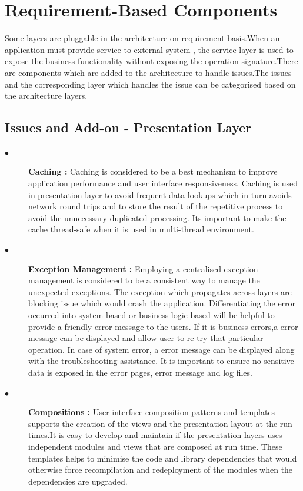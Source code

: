 \section{ Requirement-Based Components  }

			Some layers are pluggable in the architecture on requirement basis.When an application must provide service to external system , the service layer is used to expose the business functionality without exposing the operation signature.There are components which are added to the architecture to handle issues.The issues and the corresponding layer which handles the issue can be categorised based on the architecture layers.
			
\subsection{Issues and Add-on - Presentation Layer}	

\begin{description}
  \item[$\bullet$]{\bfseries Caching :} Caching is considered to be a best mechanism to improve application performance and user interface responsiveness. Caching is used in presentation layer to avoid frequent data lookups which in turn avoids network round trips and to store the result of the repetitive process to avoid the unnecessary duplicated processing. Its important to make the cache thread-safe when it is used in multi-thread environment.
  \item[$\bullet$]{\bfseries Exception Management :} Employing a centralised exception management is considered to be a consistent way to manage the unexpected exceptions. The exception which propagates across layers are blocking issue which would crash the application. Differentiating the error occurred into system-based or business logic based will be helpful to provide a friendly error message to the users. If it is business errors,a error message can be displayed and allow user to re-try that particular operation. In case of system error, a error message can be displayed along with the troubleshooting assistance. It is important to ensure no sensitive data is exposed in the error pages, error message and log files.
  \item[$\bullet$]{\bfseries Compositions :} User interface composition patterns and templates supports the creation of the views and the presentation layout at the run times.It is easy to develop and maintain if the presentation layers uses independent modules and views that are composed at run time. These templates helps to minimise the code and library dependencies that would otherwise force recompilation and redeployment of the modules when the dependencies are upgraded. 
   
\end{description}  		

